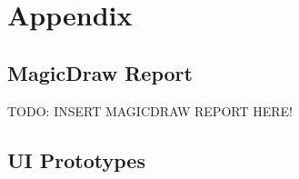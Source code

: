 \documentclass[a4paper, 12pt]{article}
\begin{document}
\listoffigures

\newpage


\section{Appendix}

\subsection{MagicDraw Report}
\color{red}TODO: INSERT MAGICDRAW REPORT HERE!\color{black}

\newpage
\subsection{UI Prototypes}
\end{document}
